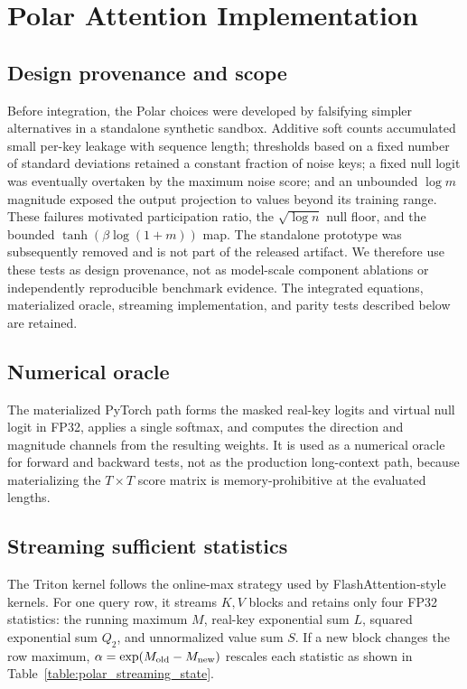 \section{Polar Attention Implementation}
\label{appendix:polar_implementation}

\subsection{Design provenance and scope}
Before integration, the Polar choices were developed by falsifying simpler alternatives in a standalone synthetic sandbox. Additive soft counts accumulated small per-key leakage with sequence length; thresholds based on a fixed number of standard deviations retained a constant fraction of noise keys; a fixed null logit was eventually overtaken by the maximum noise score; and an unbounded $\log m$ magnitude exposed the output projection to values beyond its training range. These failures motivated participation ratio, the $\sqrt{\log n}$ null floor, and the bounded $\tanh(\beta\log(1+m))$ map. The standalone prototype was subsequently removed and is not part of the released artifact. We therefore use these tests as design provenance, not as model-scale component ablations or independently reproducible benchmark evidence. The integrated equations, materialized oracle, streaming implementation, and parity tests described below are retained.

\subsection{Numerical oracle}
The materialized PyTorch path forms the masked real-key logits and virtual null logit in FP32, applies a single softmax, and computes the direction and magnitude channels from the resulting weights. It is used as a numerical oracle for forward and backward tests, not as the production long-context path, because materializing the $T\times T$ score matrix is memory-prohibitive at the evaluated lengths.

\subsection{Streaming sufficient statistics}
The Triton kernel follows the online-max strategy used by FlashAttention-style kernels. For one query row, it streams $K,V$ blocks and retains only four FP32 statistics: the running maximum $M$, real-key exponential sum $L$, squared exponential sum $Q_2$, and unnormalized value sum $S$. If a new block changes the row maximum, $\alpha=\exp(M_{\rm old}-M_{\rm new})$ rescales each statistic as shown in Table~\ref{table:polar_streaming_state}.

